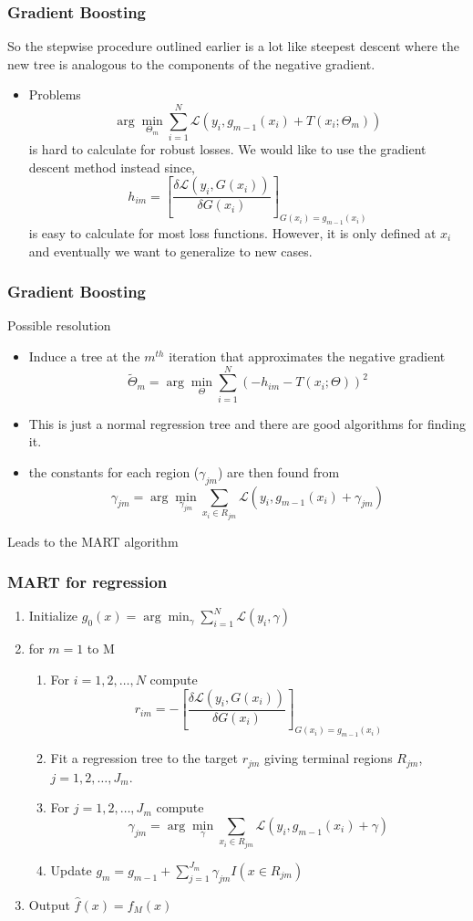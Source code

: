\documentclass{beamer}
\begin{document}
\begin{frame}
	\frametitle{Gradient Boosting}
	So the stepwise procedure outlined earlier is a lot like steepest descent where the new tree is analogous to the components of the negative gradient.
\begin{itemize}
	\item{Problems}
		\[
		\arg \min_{\Theta_m}\sum_{i=1}^N\mathcal{L}(y_i, g_{m-1}(x_i) + T(x_i; \Theta_m))
		\]
	is hard to calculate for robust losses.  We would like to use the gradient descent method instead since,
	\[
	h_{im} = \left[ \frac{\delta \mathcal{L}(y_i, G(x_i))}{\delta G(x_i)}\right]_{G(x_i) = g_{m-1}(x_i)}
	\]
 is easy to calculate for most loss functions. However,	it is  only defined at $x_i$ and eventually we want to generalize to new cases.
\end{itemize}

\end{frame}

\begin{frame}
	\frametitle{Gradient Boosting}
	Possible resolution
	\begin{itemize}
		\item 
		Induce a tree at the $m^{th}$ iteration that approximates the negative gradient
		\[
		\tilde{\Theta}_m = \arg \min_\Theta \sum_{i=1}^N (-h_{im} - T(x_i; \Theta))^2
		\]
		\item This is just a normal regression tree and there are good algorithms for finding it.
		
		\item the constants for each region ($\gamma_{jm}$) are then found from
		\[
		\gamma_{jm} = \arg \min_{\gamma_{jm}} \sum_{x_i \in R_{jm}} \mathcal{L}(y_i, g_{m-1}(x_i) + \gamma_{jm}) 
		\]
	\end{itemize}
Leads to the MART algorithm
	
\end{frame}

\begin{frame}
	\frametitle{MART for regression}
	\begin{enumerate}
		\item Initialize $g_0(x) = \arg \min_\gamma \sum_{i=1}^N \mathcal{L}(y_i, \gamma)$
		\item for $m=1$ to M
		\begin{enumerate}
			\item For $i=1,2,\ldots, N$ compute
			\[
			r_{im} = - \left[ \frac{\delta \mathcal{L}(y_i, G(x_i))}{\delta G(x_i)}\right]_{G(x_i) = g_{m-1}(x_i)}
			\]
		\item Fit a regression tree to the target $r_{jm}$ giving terminal regions $R_{jm}$, $j = 1,2,\ldots, J_m$.
		\item For $j = 1,2,\ldots, J_m$ compute 
			\[
			\gamma_{jm} = \arg \min_{\gamma} \sum_{x_i \in R_{jm}} \mathcal{L}(y_i, g_{m-1}(x_i) + \gamma) 
			\]
		\item Update $g_m = g_{m-1} + \sum_{j=1}^{J_m} \gamma_{jm}I(x \in R_{jm}) $
		\end{enumerate}
	\item{Output $\hat{f}(x) = f_M(x)$}
	\end{enumerate}
\end{frame}
\end{document}

